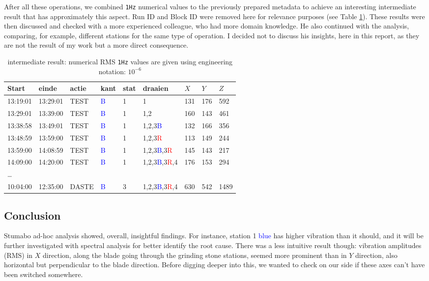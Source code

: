 After all these operations, we combined \texttt{1Hz} numerical values to the previously prepared metadata to achieve an interesting intermediate result that has approximately this aspect. 
Run ID and Block ID were removed here for relevance purposes (see Table \ref{tab:stu_intermediate_res}).  
These results were then discussed and checked with a more experienced colleague, who had more domain knowledge. 
He also continued with the analysis, comparing, for example, different stations for the same type of operation. 
I decided not to discuss his insights, here in this report, as they are not the result of my work but a more direct consequence.
\begin{table}[ht]
    \centering
    \begin{tabularx}{\textwidth}{@{}lllllllll@{}}
    \toprule
    Start & einde & actie & kant & stat & draaien & $X$ & $Y$ & $Z$ \\ \midrule
    13:19:01 & 13:29:01 & TEST & \textcolor{blue}{B} & 1 & 1 & 131 & 176 & 592 \\ 
    13:29:01 & 13:39:00 & TEST & \textcolor{blue}{B} & 1 & 1,2 & 160 & 143 & 461 \\  
    13:38:58 & 13:49:01 & TEST & \textcolor{blue}{B} & 1 & 1,2,3\textcolor{blue}{B} & 132 & 166 & 356 \\ 
    13:48:59 & 13:59:00 & TEST & \textcolor{blue}{B} & 1 & 1,2,3\textcolor{red}{R} & 113 & 149 & 244  \\
    13:59:00 & 14:08:59 & TEST & \textcolor{blue}{B} & 1 & 1,2,3\textcolor{blue}{B},3\textcolor{red}{R} & 145 & 143 & 217 \\ 
    14:09:00 & 14:20:00 & TEST & \textcolor{blue}{B} & 1 & 1,2,3\textcolor{blue}{B},3\textcolor{red}{R},4 & 176 & 153 & 294 \\ 
    \dots \\
    10:04:00 & 12:35:00 & DASTE & \textcolor{blue}{B} & 3 & 1,2,3\textcolor{blue}{B},3\textcolor{red}{R},4 & 630 & 542 & 1489 \\
    \bottomrule
    \end{tabularx}
    \caption{intermediate result: numerical RMS \texttt{1Hz} values are given using engineering notation: $10^{-6}$}
    \label{tab:stu_intermediate_res}
\end{table}

\subsection{Conclusion}
Stumabo ad-hoc analysis showed, overall, insightful findings. For instance, station 1 \textcolor{blue}{blue} has higher vibration than it should, 
and it will be further investigated with spectral analysis for better identify the root cause.
There was a less intuitive result though: vibration amplitudes (RMS) in $X$ direction, along the blade going through the grinding stone stations,
seemed more prominent than in $Y$ direction, also horizontal but perpendicular to the blade direction.
Before digging deeper into this, we wanted to check on our side if these axes can't have been switched somewhere.

